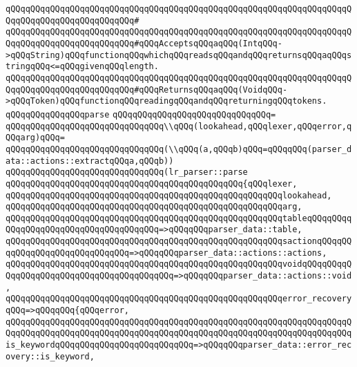 \verb|qQQqqQQqqQQqqQQqqQQqqQQqqQQqqQQqqQQqqQQqqQQqqQQqqQQqqQQqqQQqqQQqqQQqqQQqqQQqqQQqqQQqqQQqqQQqqQQq#|\newline
\verb|qQQqqQQqqQQqqQQqqQQqqQQqqQQqqQQqqQQqqQQqqQQqqQQqqQQqqQQqqQQqqQQqqQQqqQQqqQQqqQQqqQQqqQQqqQQqqQQq#qQQqAcceptsqQQqaqQQq(IntqQQq->qQQqString)qQQqfunctionqQQqwhichqQQqreadsqQQqandqQQqreturnsqQQqaqQQqstringqQQq<=qQQqgivenqQQqlength.|\newline
\verb|qQQqqQQqqQQqqQQqqQQqqQQqqQQqqQQqqQQqqQQqqQQqqQQqqQQqqQQqqQQqqQQqqQQqqQQqqQQqqQQqqQQqqQQqqQQqqQQq#qQQqReturnsqQQqaqQQq(VoidqQQq->qQQqToken)qQQqfunctionqQQqreadingqQQqandqQQqreturningqQQqtokens.|\newline
\verb|qQQqqQQqqQQqqQQqparse|\newline
\verb|qQQqqQQqqQQqqQQqqQQqqQQqqQQqqQQq=|\newline
\verb|qQQqqQQqqQQqqQQqqQQqqQQqqQQqqQQq\\qQQq(lookahead,qQQqlexer,qQQqerror,qQQqarg)qQQq=|\newline
\verb|qQQqqQQqqQQqqQQqqQQqqQQqqQQqqQQq(\\qQQq(a,qQQqb)qQQq=qQQqqQQq(parser_data::actions::extractqQQqa,qQQqb))|\newline
\verb|qQQqqQQqqQQqqQQqqQQqqQQqqQQqqQQq(lr_parser::parse|\newline
\verb|qQQqqQQqqQQqqQQqqQQqqQQqqQQqqQQqqQQqqQQqqQQqqQQq{qQQqlexer,|\newline
\verb|qQQqqQQqqQQqqQQqqQQqqQQqqQQqqQQqqQQqqQQqqQQqqQQqqQQqqQQqlookahead,|\newline
\verb|qQQqqQQqqQQqqQQqqQQqqQQqqQQqqQQqqQQqqQQqqQQqqQQqqQQqqQQqarg,|\newline
\verb|qQQqqQQqqQQqqQQqqQQqqQQqqQQqqQQqqQQqqQQqqQQqqQQqqQQqqQQqtableqQQqqQQqqQQqqQQqqQQqqQQqqQQqqQQqqQQqqQQq=>qQQqqQQqparser_data::table,|\newline
\verb|qQQqqQQqqQQqqQQqqQQqqQQqqQQqqQQqqQQqqQQqqQQqqQQqqQQqqQQqsactionqQQqqQQqqQQqqQQqqQQqqQQqqQQqqQQq=>qQQqqQQqparser_data::actions::actions,|\newline
\verb|qQQqqQQqqQQqqQQqqQQqqQQqqQQqqQQqqQQqqQQqqQQqqQQqqQQqqQQqvoidqQQqqQQqqQQqqQQqqQQqqQQqqQQqqQQqqQQqqQQqqQQq=>qQQqqQQqparser_data::actions::void,|\newline
\verb|qQQqqQQqqQQqqQQqqQQqqQQqqQQqqQQqqQQqqQQqqQQqqQQqqQQqqQQqerror_recoveryqQQq=>qQQqqQQq{qQQqerror,|\newline
\verb|qQQqqQQqqQQqqQQqqQQqqQQqqQQqqQQqqQQqqQQqqQQqqQQqqQQqqQQqqQQqqQQqqQQqqQQqqQQqqQQqqQQqqQQqqQQqqQQqqQQqqQQqqQQqqQQqqQQqqQQqqQQqqQQqqQQqqQQqqQQqis_keywordqQQqqQQqqQQqqQQqqQQqqQQqqQQq=>qQQqqQQqparser_data::error_recovery::is_keyword,|\newline
